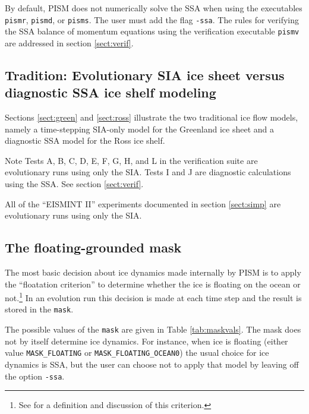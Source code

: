 \documentclass[11pt,final]{amsart}
\renewcommand{\t}[1]{\texttt{#1}}
\newcommand{\pismoptionindex}[1]{\index{options for PISM (and PETSc)!\texttt{-#1}}}
\newcommand{\intextoption}[1]{\texttt{-#1}\pismoptionindex{#1}}
\begin{document}
By default, PISM does not numerically solve the SSA when using the executables \verb|pismr|, \verb|pismd|, or \verb|pisms|.  The user must add the flag \intextoption{ssa}.  The rules for verifying the SSA balance of momentum equations using the verification executable \verb|pismv| are addressed in section \ref{sect:verif}.


\subsection{Tradition: Evolutionary SIA ice sheet versus diagnostic SSA ice shelf modeling} \label{subsect:basicmodes}  Sections \ref{sect:green} and \ref{sect:ross} illustrate the two traditional ice flow models, namely a time-stepping SIA-only model for the Greenland ice sheet and a diagnostic SSA model for the Ross ice shelf.

Note Tests A, B, C, D, E, F, G, H, and L in the verification suite are evolutionary runs using only the SIA.  Tests I and J are diagnostic calculations using the SSA.  See section \ref{sect:verif}.

All of the ``EISMINT II'' experiments documented in section \ref{sect:simp} are evolutionary runs using only the SIA.


\subsection{The floating-grounded mask} \label{subsect:mask}  The most basic decision about ice dynamics made internally by PISM is to apply the ``floatation criterion'' to determine whether the ice is floating on the ocean or not.\footnote{See \cite{WeisGreveHutter} for a definition and discussion of this criterion.}  In an evolution run this decision is made at each time step and the result is stored in the \t{mask}.

The possible values of the \t{mask} are given in Table \ref{tab:maskvals}.  The mask does not by itself determine ice dynamics.  For instance, when ice is floating (either value \verb|MASK_FLOATING| or \verb|MASK_FLOATING_OCEAN0|) the usual choice for ice dynamics is SSA, but the user can choose not to apply that model by leaving off the option \verb|-ssa|.
\end{document}
